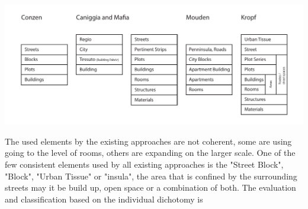 \documentclass{nature}
\makeatletter
\renewenvironment*{figure}{\@float{figure}}{\end@float}
\makeatother
\begin{document}
\begin{figure}
\centering    
\includegraphics[scale=0.80,page=1]{Images/Typology_Dichtomies.pdf}  
\caption{\bf Different scales of dichotomies. }    
 \label{fig:TypologyDichtomies}  
\end{figure} 



The used elements by the existing approaches are not coherent, some are using going to the level of rooms, others are expanding on the larger scale. One of the few consistent elements used by all existing approaches is the "Street Block", "Block", "Urban Tissue" or "insula", the area that is confined by the surrounding streets may it be build up, open space or a combination of both.
The evaluation and classification based on the individual dichotomy is 
\end{document}
